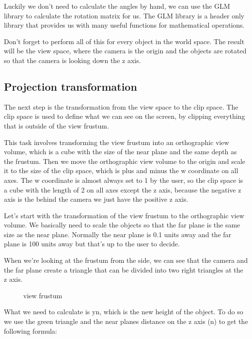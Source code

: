 \documentclass[12pt]{report} \usepackage{preamble}
\begin{document}
Luckily we don't need to calculate the angles by hand, we can use the
\ac{GLM} library to calculate the rotation matrix for us. The \ac{GLM} library is a
header only library that provides us with many useful functions for
mathematical operations.

Don't forget to perform all of this for every object in the world space.
The result will be the view space, where the camera is the origin and
the objects are rotated so that the camera is looking down the z axis.

\subsection{Projection transformation}

The next step is the transformation from the view space to the clip
space. The clip space is used to define what we can see
on the screen, by clipping everything that is outside of the view frustum.

This task involves transforming the view frustum into an orthographic view
volume, which is a cube with the size of the near plane and the same depth
as the frustum. Then we move the orthographic view volume to the origin
and scale it to the size of the clip space, which is plus and minus the
w coordinate on all axes. The w coordinate is almost always set to 1 by the user,
so the clip space is a cube with the length of 2 on all axes except the z axis,
because the negative z axis is the behind the camera we just have the positive
z axis.

Let's start with the transformation of the view frustum to the orthographic
view volume. We basically need to scale the objects so that the far plane is
the same size as the near plane. Normally the near plane is 0.1 units away and the far
plane is 100 units away but that's up to the user to decide.

When we're looking at the frustum from the side, we can see that the camera and
the far plane create a triangle that can be divided into two right triangles at the
z axis.

\begin{figure}[hbtp]
	\centering 
	\caption{view frustum}
\end{figure} \Floatbarrier

What we need to calculate is yn, which is the new height of the object.
To do so we use the green triangle and the near planes distance on the z axis
(n) to get the following formula:
\end{document}
